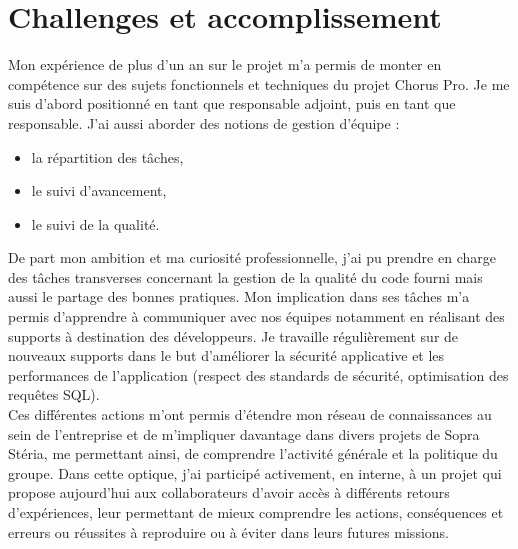 \documentclass[12pt,a4paper]{article}
\begin{document}
\section{Challenges et accomplissement}
Mon expérience de plus d'un an sur le projet m'a permis de monter en compétence sur des sujets fonctionnels et techniques du projet Chorus Pro. Je me suis d'abord positionné en tant que responsable adjoint, puis en tant que responsable. J'ai aussi aborder des notions de gestion d'équipe :
\begin{itemize}
\item la répartition des tâches,
\item le suivi d'avancement,
\item le suivi de la qualité.
\end{itemize}
De part mon ambition et ma curiosité professionnelle, j'ai pu prendre en charge des tâches transverses concernant la gestion de la qualité du code fourni mais aussi le partage des bonnes pratiques. Mon implication dans ses tâches m'a permis d'apprendre à communiquer avec nos équipes notamment en réalisant des supports à destination des développeurs. Je travaille régulièrement sur de nouveaux supports dans le but d'améliorer la sécurité applicative et les performances de l'application (respect des standards de sécurité, optimisation des requêtes SQL).\\
Ces différentes actions m'ont permis d'étendre mon réseau de connaissances au sein de l'entreprise et de m'impliquer davantage dans divers projets de Sopra Stéria, me permettant ainsi, de comprendre l'activité générale et la politique du groupe. Dans cette optique, j'ai participé activement, en interne, à un projet qui propose aujourd'hui aux collaborateurs d'avoir accès à différents retours d'expériences, leur permettant de mieux comprendre les actions, conséquences et erreurs ou réussites à reproduire ou à éviter dans leurs futures missions.
\newpage
\end{document}
